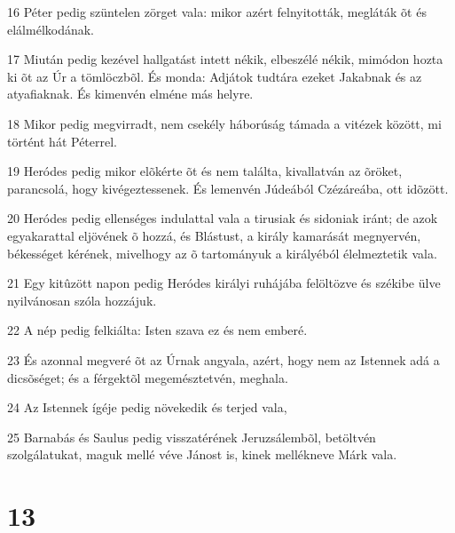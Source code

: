 \par 16 Péter pedig szüntelen zörget vala: mikor azért felnyitották, megláták õt és elálmélkodának.
\par 17 Miután pedig kezével hallgatást intett nékik, elbeszélé nékik, mimódon hozta ki õt az Úr a tömlöczbõl. És monda: Adjátok tudtára ezeket Jakabnak és az atyafiaknak. És kimenvén elméne más helyre.
\par 18 Mikor pedig megvirradt, nem csekély háborúság támada a vitézek között, mi történt hát Péterrel.
\par 19 Heródes pedig mikor elõkérte õt és nem találta, kivallatván az õröket, parancsolá, hogy kivégeztessenek. És lemenvén Júdeából Czézáreába, ott idõzött.
\par 20 Heródes pedig ellenséges indulattal vala a tirusiak és sidoniak iránt; de azok egyakarattal eljövének õ hozzá, és Blástust, a király kamarását megnyervén, békességet kérének, mivelhogy az õ tartományuk a királyéból élelmeztetik vala.
\par 21 Egy kitûzött napon pedig Heródes királyi ruhájába felöltözve és székibe ülve nyilvánosan szóla hozzájuk.
\par 22 A nép pedig felkiálta: Isten szava ez és nem emberé.
\par 23 És azonnal megveré õt az Úrnak angyala, azért, hogy nem az Istennek adá a dicsõséget;  és a férgektõl megemésztetvén, meghala.
\par 24 Az Istennek ígéje pedig növekedik és terjed vala,
\par 25 Barnabás és Saulus pedig visszatérének Jeruzsálembõl, betöltvén szolgálatukat, maguk mellé véve Jánost is, kinek mellékneve Márk vala.

\chapter{13}

